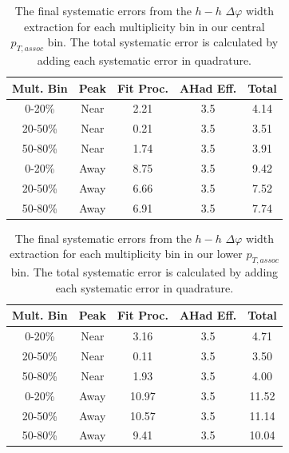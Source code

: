 \documentclass[ALICE,manyauthors]{ALICE_analysis_notes}
\begin{document}
\begin{table}[ht]
\centering
\begin{tabular}{|c|c||c|c||c|}
\hline
Mult. Bin & Peak & Fit Proc. & AHad Eff. & Total \\
\hline
0-20\% & Near & 2.21 & 3.5 & 4.14 \\
20-50\% & Near & 0.21 & 3.5 & 3.51 \\
50-80\% & Near & 1.74 & 3.5 & 3.91 \\
0-20\% & Away & 8.75 & 3.5 & 9.42 \\
20-50\% & Away & 6.66 & 3.5 & 7.52 \\
50-80\% & Away & 6.91 & 3.5 & 7.74 \\ 
\hline
\end{tabular}
\caption{The final systematic errors from the $h-h$ $\Delta\varphi$ width extraction  for each multiplicity bin in our central $p_{T, assoc}$ bin. The total systematic error is calculated by adding each systematic error in quadrature.}
\label{h_h_width_systematic_table}
\end{table}

\begin{table}[ht]
\centering
\begin{tabular}{|c|c||c|c||c|}
\hline
Mult. Bin & Peak & Fit Proc. & AHad Eff. & Total \\
\hline
0-20\% & Near & 3.16 & 3.5 & 4.71 \\
20-50\% & Near & 0.11 & 3.5 & 3.50 \\
50-80\% & Near & 1.93 & 3.5 & 4.00 \\
0-20\% & Away & 10.97 & 3.5 & 11.52 \\
20-50\% & Away & 10.57 & 3.5 & 11.14 \\
50-80\% & Away & 9.41 & 3.5 & 10.04 \\
\hline
\end{tabular}
\caption{The final systematic errors from the $h-h$ $\Delta\varphi$ width extraction  for each multiplicity bin in our lower $p_{T, assoc}$ bin. The total systematic error is calculated by adding each systematic error in quadrature.}
\label{h_h_width_systematic_table_lowpt}
\end{table}
\end{document}
